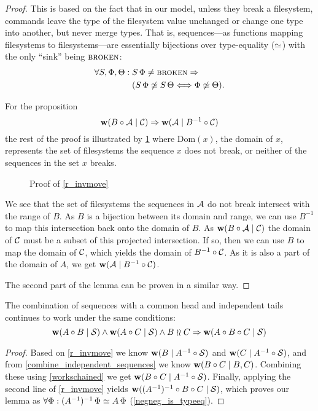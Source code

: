 \begin{proof}


This is based on the fact that in our model, unless they break a filesystem,
commands leave the type of the filesystem value unchanged 
or change one type into another, but never merge types.
That is,
sequences---as functions mapping filesystems to filesystems---are
essentially bijections over type-equality ($\simeq$)
with the only ``sink'' being $\text{\normalfont\scshape{broken}}$:
\begin{align*}
\forall S,\Phi,\Theta:{}&S\,\Phi\neq\text{\normalfont\scshape{broken}} \Rightarrow \\
&(S\,\Phi\not\simeq S\,\Theta \Longleftrightarrow \Phi\not\simeq \Theta).
\end{align*}

For the proposition
\[ \mathbf{w}({B\circ \mathcal{A}}\mathrel{|}{\mathcal{C}}) \Rightarrow \mathbf{w}({\mathcal{A}}\mathrel{|}{B^{-1}\circ \mathcal{C}}) \]
the rest of the proof is illustrated by \cref{fig_invmove}
where $\textrm{Dom}(x)$, the domain of $x$, represents the set of filesystems
the sequence $x$ does not break, or neither of the sequences in the set $x$ breaks.

\begin{figure}[htb]

\caption{Proof of \cref{r_invmove}}\label{fig_invmove}
\end{figure}

We see that the set of filesystems the sequences in $\mathcal{A}$ do not break intersect with the range of $B$.
As $B$ is a bijection between its domain and range, we can use $B^{-1}$ to map this intersection back
onto the domain of $B$.
As $\mathbf{w}({B\circ \mathcal{A}}\mathrel{|}{\mathcal{C}})$ the domain of $\mathcal{C}$ must be a subset of this
projected intersection.
If so, then we can use $B$ to map the domain of $\mathcal{C}$, which yields the domain of $B^{-1}\circ \mathcal{C}$.
As it is also a part of the domain of $A$, we get $\mathbf{w}({\mathcal{A}}\mathrel{|}{B^{-1}\circ \mathcal{C}})$.

The second part of the lemma can be proven in a similar way.
\end{proof}


\begin{mylem}\label{indep_prefix_combine}
The combination of sequences with a common head and independent tails 
continues to work under the same conditions:
\[ \mathbf{w}({A\circ B}\mathrel{|}{\mathcal{S}}) \wedge \mathbf{w}({A\circ C}\mathrel{|}{\mathcal{S}}) \wedge B\mathrel{\wr\wr} C \Rightarrow \mathbf{w}({A\circ B\circ C}\mathrel{|}{\mathcal{S}}) \]
\end{mylem}
\begin{proof}
Based on \cref{r_invmove} we know
$\mathbf{w}({B}\mathrel{|}{A^{-1}\circ \mathcal{S}})$ and $\mathbf{w}({C}\mathrel{|}{A^{-1}\circ \mathcal{S}})$,
and from \cref{combine_independent_sequences} we know
$\mathbf{w}({B\circ C}\mathrel{|}{B,C})$.
Combining these using \cref{workschained}
we get
$\mathbf{w}({B\circ C}\mathrel{|}{A^{-1}\circ \mathcal{S}})$. 
Finally, applying the second line of \cref{r_invmove} yields
$\mathbf{w}({(A^{-1})^{-1}\circ B\circ C}\mathrel{|}{\mathcal{S}})$, which proves our lemma 
as $\forall\Phi: (A^{-1})^{-1}\,\Phi\simeq A\,\Phi$ (\cref{negneg_is_typeeq}).
\end{proof}
